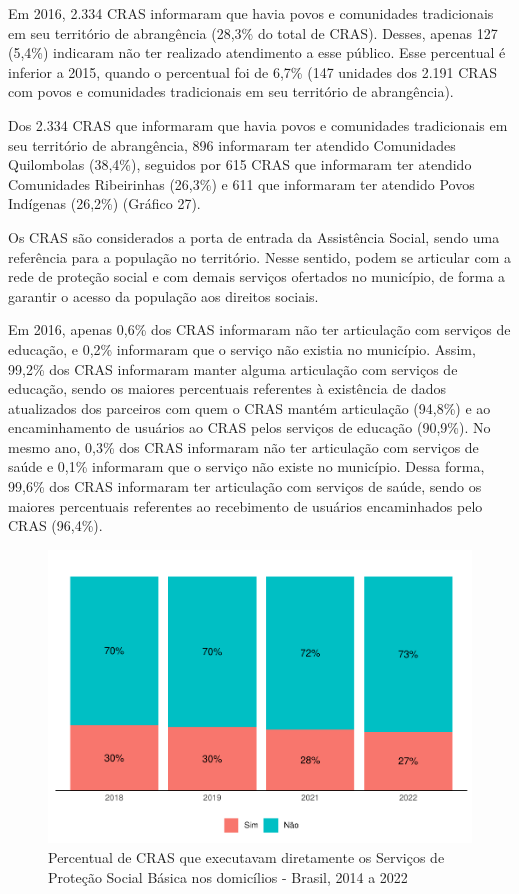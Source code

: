 \documentclass[
  brazilian]{report}
\begin{document}
Em 2016, 2.334 CRAS informaram que havia povos e comunidades
tradicionais em seu território de abrangência (28,3\% do total de CRAS).
Desses, apenas 127 (5,4\%) indicaram não ter realizado atendimento a
esse público. Esse percentual é inferior a 2015, quando o percentual foi
de 6,7\% (147 unidades dos 2.191 CRAS com povos e comunidades
tradicionais em seu território de abrangência).

Dos 2.334 CRAS que informaram que havia povos e comunidades tradicionais
em seu território de abrangência, 896 informaram ter atendido
Comunidades Quilombolas (38,4\%), seguidos por 615 CRAS que informaram
ter atendido Comunidades Ribeirinhas (26,3\%) e 611 que informaram ter
atendido Povos Indígenas (26,2\%) (Gráfico 27).

Os CRAS são considerados a porta de entrada da Assistência Social, sendo
uma referência para a população no território. Nesse sentido, podem se
articular com a rede de proteção social e com demais serviços ofertados
no município, de forma a garantir o acesso da população aos direitos
sociais.

Em 2016, apenas 0,6\% dos CRAS informaram não ter articulação com
serviços de educação, e 0,2\% informaram que o serviço não existia no
município. Assim, 99,2\% dos CRAS informaram manter alguma articulação
com serviços de educação, sendo os maiores percentuais referentes à
existência de dados atualizados dos parceiros com quem o CRAS mantém
articulação (94,8\%) e ao encaminhamento de usuários ao CRAS pelos
serviços de educação (90,9\%). No mesmo ano, 0,3\% dos CRAS informaram
não ter articulação com serviços de saúde e 0,1\% informaram que o
serviço não existe no município. Dessa forma, 99,6\% dos CRAS informaram
ter articulação com serviços de saúde, sendo os maiores percentuais
referentes ao recebimento de usuários encaminhados pelo CRAS (96,4\%).

\begin{figure}
\includegraphics{Censo-SUAS-2022_files/figure-latex/CRAS-PSB-1} \caption[Percentual de CRAS que executavam diretamente os Serviços de Proteção Social Básica nos domicílios - Brasil, 2014 a 2022]{Percentual de CRAS que executavam diretamente os Serviços de Proteção Social Básica nos domicílios - Brasil, 2014 a 2022}\label{fig:CRAS-PSB}
\end{figure}
\end{document}
